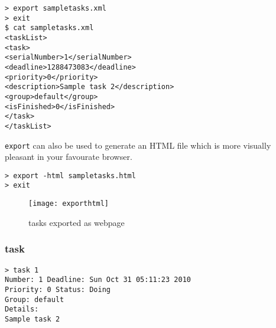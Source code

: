 \documentclass[12pt, a4paper]{article}
\begin{document}
\begin{enumerate}
\texttt{\textgreater \ export sampletasks.xml \footnotemark\\
  \textgreater \ exit\\
  \$ cat sampletasks.xml\\
  <taskList>\\
  <task>\\
  <serialNumber>1</serialNumber>\\
  <deadline>1288473083</deadline>\\
  <priority>0</priority>\\
  <description>Sample task 2</description>\\
  <group>default</group>\\
  <isFinished>0</isFinished>\\
  </task>\\
  </taskList>}

 
\texttt{export} can also be used to generate an HTML file which is more visually pleasant in your favourate browser.

\texttt{\textgreater \ export -html sampletasks.html\\
  \textgreater \ exit}

\begin{figure}[htbp]
  \centering
  \texttt{[image: exporthtml]}
  \caption{tasks exported as webpage \footnotemark}
\end{figure}

\end{enumerate}

\subsubsection{task}
\noindent \texttt{\textgreater \ task 1\\
  Number: 1 Deadline: Sun Oct 31 05:11:23 2010\\
  Priority: 0 Status: Doing\\
  Group: default\\
  Details:\\
  Sample task 2 \footnotemark}

\end{document}

